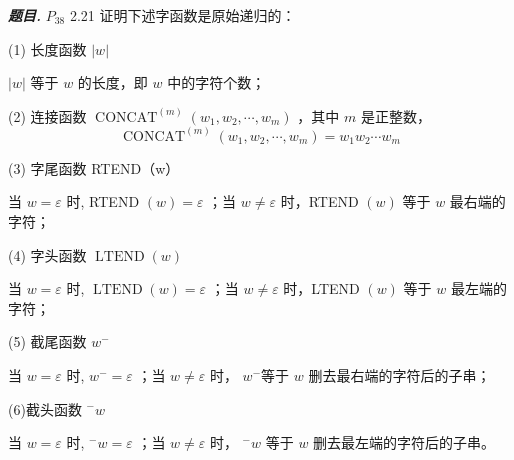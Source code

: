 \documentclass[10pt, a4paper, oneside]{ctexart}
\newenvironment{problem}{\begin{framed}\par\noindent\textbf{\textit{题目. }}}{\end{framed}\par}
\begin{document}
\begin{problem}
    $P_{38}$ 2.21 证明下述字函数是原始递归的：

(1) 长度函数 $|w|$

$|w|$ 等于 $w$ 的长度，即 $w$ 中的字符个数；

(2) 连接函数 $\operatorname{CONCAT}^{(m)}\left(w_1, w_2, \cdots, w_m\right)$ ，其中 $m$ 是正整数，
$$
\operatorname{CONCAT}^{(m)}\left(w_1, w_2, \cdots, w_m\right)=w_1 w_2 \cdots w_m
$$

(3) 字尾函数 RTEND（w）

当 $w=\varepsilon$ 时, RTEND $(w)=\varepsilon$ ；当 $w \neq \varepsilon$ 时，RTEND $(w)$ 等于 $w$ 最右端的字符；

(4) 字头函数 $\operatorname{LTEND}(w)$

当 $w=\varepsilon$ 时, $\operatorname{LTEND}(w)=\varepsilon$ ；当 $w \neq \varepsilon$ 时，LTEND $(w)$ 等于 $w$ 最左端的字符；

(5) 截尾函数 $w^{-}$

当 $w=\varepsilon$ 时, $w^{-}=\varepsilon$ ；当 $w \neq \varepsilon$ 时， $w^{-}$等于 $w$ 删去最右端的字符后的子串；

(6)截头函数 $^-w$

当 $w=\varepsilon$ 时, $^-w=\varepsilon$ ；当 $w \neq \varepsilon$ 时， $^-w$ 等于 $w$ 删去最左端的字符后的子串。
\end{problem}
\end{document}
